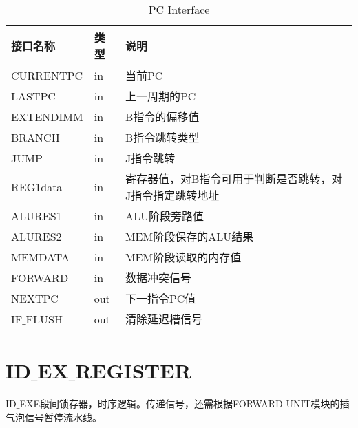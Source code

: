 \begin{center}
\renewcommand{\arraystretch}{1.3}
\small
\begin{longtable}{|p{3cm}<{\centering}|p{1.4cm}<{\centering}|p{7cm}<{\centering}|}
\caption{PC Interface}
\label{tab:treatments}\\
\hline
接口名称 & 类型 & 说明 \\
\hline
CURRENTPC & in & 当前PC \\
\hline
LASTPC & in & 上一周期的PC \\
\hline
EXTENDIMM & in & B指令的偏移值 \\
\hline
BRANCH & in & B指令跳转类型 \\
\hline
JUMP & in & J指令跳转 \\
\hline
REG1data & in & 寄存器值，对B指令可用于判断是否跳转，对J指令指定跳转地址 \\
\hline
ALURES1 & in & ALU阶段旁路值 \\
\hline
ALURES2 & in & MEM阶段保存的ALU结果 \\
\hline
MEMDATA & in &  MEM阶段读取的内存值 \\
\hline
FORWARD & in & 数据冲突信号 \\
\hline
NEXTPC & out & 下一指令PC值 \\
\hline
IF$\_$FLUSH & out & 清除延迟槽信号 \\
\hline
\end{longtable}
\end{center}


\section{ID$\_$EX$\_$REGISTER}

ID$\_$EXE段间锁存器，时序逻辑。传递信号，还需根据FORWARD UNIT模块的插气泡信号暂停流水线。

